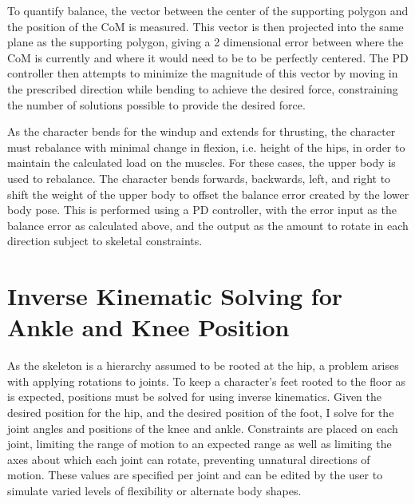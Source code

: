 To quantify balance, the vector between the center of the supporting polygon and the position of the CoM is measured.  This vector is then projected into the same plane as the supporting polygon, giving a 2 dimensional error between where the CoM is currently and where it would need to be to be perfectly centered.  The PD controller then attempts to minimize the magnitude of this vector by moving in the prescribed direction while bending to achieve the desired force, constraining the number of solutions possible to provide the desired force.


As the character bends for the windup and extends for thrusting, the character must rebalance with minimal change in flexion, i.e. height of the hips, in order to maintain the calculated load on the muscles.  For these cases, the upper body is used to rebalance.  The character bends forwards, backwards, left, and right to shift the weight of the upper body to offset the balance error created by the lower body pose.  This is performed using a PD controller, with the error input as the balance error as calculated above, and the output as the amount to rotate in each direction subject to skeletal constraints.

\section{Inverse Kinematic Solving for Ankle and Knee Position}
\label{section:ik}


As the skeleton is a hierarchy assumed to be rooted at the hip, a problem arises with applying rotations to joints.  To keep a character's feet rooted to the floor as is expected, positions must be solved for using inverse kinematics.  Given the desired position for the hip, and the desired position of the foot, I solve for the joint angles and positions of the knee and ankle.  Constraints are placed on each joint, limiting the range of motion to an expected range as well as limiting the axes about which each joint can rotate, preventing unnatural directions of motion.  These values are specified per joint and can be edited by the user to simulate varied levels of flexibility or alternate body shapes.


